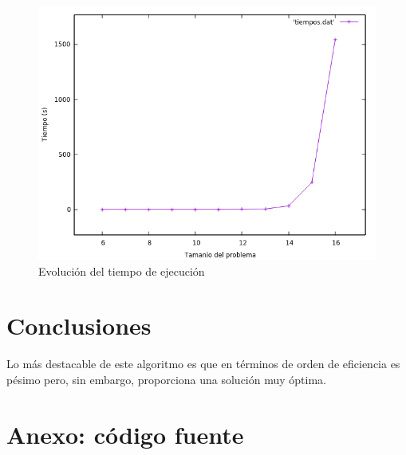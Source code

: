 \documentclass[12pt,spanish]{article}
\begin{document}
\begin{figure}[H]
\centering
\includegraphics[scale=0.75]{tiempos.png}
\caption{Evolución del tiempo de ejecución}
\end{figure}


\section{Conclusiones}

Lo más destacable de este algoritmo es que en términos de orden de eficiencia es pésimo pero, sin embargo, proporciona una solución muy óptima.

\section{Anexo: código fuente}




\end{document}
